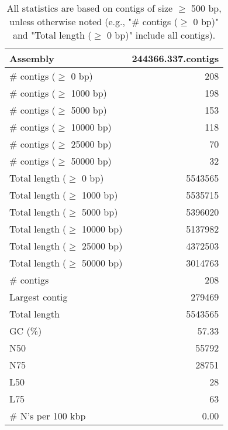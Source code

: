 \documentclass[12pt,a4paper]{article}
\begin{document}
\begin{table}[ht]
\begin{center}
\caption{All statistics are based on contigs of size $\geq$ 500 bp, unless otherwise noted (e.g., "\# contigs ($\geq$ 0 bp)" and "Total length ($\geq$ 0 bp)" include all contigs).}
\begin{tabular}{|l*{1}{|r}|}
\hline
Assembly & 244366.337.contigs \\ \hline
\# contigs ($\geq$ 0 bp) & 208 \\ \hline
\# contigs ($\geq$ 1000 bp) & 198 \\ \hline
\# contigs ($\geq$ 5000 bp) & 153 \\ \hline
\# contigs ($\geq$ 10000 bp) & 118 \\ \hline
\# contigs ($\geq$ 25000 bp) & 70 \\ \hline
\# contigs ($\geq$ 50000 bp) & 32 \\ \hline
Total length ($\geq$ 0 bp) & 5543565 \\ \hline
Total length ($\geq$ 1000 bp) & 5535715 \\ \hline
Total length ($\geq$ 5000 bp) & 5396020 \\ \hline
Total length ($\geq$ 10000 bp) & 5137982 \\ \hline
Total length ($\geq$ 25000 bp) & 4372503 \\ \hline
Total length ($\geq$ 50000 bp) & 3014763 \\ \hline
\# contigs & 208 \\ \hline
Largest contig & 279469 \\ \hline
Total length & 5543565 \\ \hline
GC (\%) & 57.33 \\ \hline
N50 & 55792 \\ \hline
N75 & 28751 \\ \hline
L50 & 28 \\ \hline
L75 & 63 \\ \hline
\# N's per 100 kbp & 0.00 \\ \hline
\end{tabular}
\end{center}
\end{table}
\end{document}
